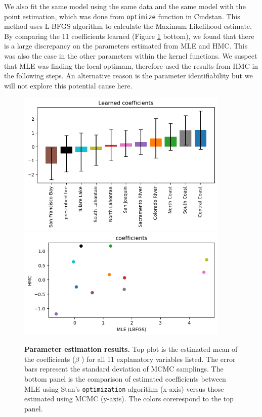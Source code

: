 \documentclass{article}
\begin{document}
We also fit the same model using the same data and the same model with the point estimation, which was done from \texttt{optimize} function in Cmdstan. This method uses L-BFGS algorithm to calculate the Maximum Likelihood estimate. By comparing the 11 coefficients learned (Figure \ref{fig:coeff} bottom), we found that there is a large discrepancy on the parameters estimated from MLE and HMC. This was also the case in the other parameters within the kernel functions. We suspect that MLE was finding the local optimam, therefore used the results from HMC in the following steps. An alternative reason is the parameter identifiability but we will not explore this potential cause here. 




\begin{figure}[!t]
  \centering
\includegraphics[width=0.9\textwidth]{latex_template/figs/betas.png}
\includegraphics[width=0.9\textwidth]{latex_template/figs/hmc_mle.png}
\caption{\textbf{Parameter estimation results.} Top plot is the estimated mean of the coefficients ($\beta$ ) for all 11 explanatory variables listed. The error bars represent the standard deviation of MCMC samplings. The bottom panel is the comparison of estimated coefficients between MLE using Stan's \texttt{optimization} algorithm (x-axis) versus those estimated using MCMC (y-axis). The colors corerespond to the top panel. }
\label{fig:coeff}
\end{figure}
\end{document}

